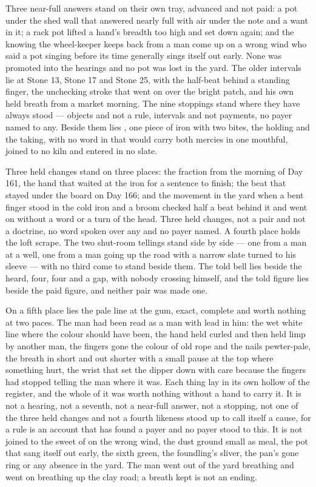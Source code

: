 Three near-full answers stand on their own tray, advanced and not paid: a pot under the shed wall that answered nearly full with air under the note and a want in it; a rack pot lifted a hand's breadth too high and set down again; and the knowing the wheel-keeper keeps back from a man come up on a wrong wind who said a pot singing before its time generally sings itself out early. None was promoted into the hearings and no pot was lost in the yard. The older intervals lie at Stone 13, Stone 17 and Stone 25, with the half-beat behind a standing finger, the unchecking stroke that went on over the bright patch, and his own held breath from a market morning. The nine stoppings stand where they have always stood --- objects and not a rule, intervals and not payments, no payer named to any. Beside them lies , one piece of iron with two bites, the holding and the taking, with no word in  that would carry both mercies in one mouthful, joined to no kiln and entered in no slate.

Three held changes stand on three places: the fraction from the morning of Day 161, the hand that waited at the iron for a sentence to finish; the beat that stayed under the board on Day 166; and the movement in the yard when a bent finger stood in the cold iron and a broom checked half a beat behind it and went on without a word or a turn of the head. Three held changes, not a pair and not a doctrine, no word spoken over any and no payer named. A fourth place holds the loft scrape. The two shut-room tellings stand side by side --- one from a man at a well, one from a man going up the road with a narrow slate turned to his sleeve --- with no third come to stand beside them. The told bell lies beside the heard, four, four and a gap, with nobody crossing himself, and the told figure lies beside the paid figure, and neither pair was made one.

On a fifth place lies the pale line at the gum, exact, complete and worth nothing at two paces. The man had been read as a man with lead in him: the wet white line where the colour should have been, the hand held curled and then held limp by another man, the fingers gone the colour of old rope and the nails pewter-pale, the breath in short and out shorter with a small pause at the top where something hurt, the wrist that set the dipper down with care because the fingers had stopped telling the man where it was. Each thing lay in its own hollow of the register, and the whole of it was worth nothing without a hand to carry it. It is not a hearing, not a seventh, not a near-full answer, not a stopping, not one of the three held changes and not a fourth likeness stood up to call itself a cause, for a rule is an account that has found a payer and no payer stood to this. It is not joined to the sweet of  on the wrong wind, the dust ground small as meal, the pot that sang itself out early, the sixth green, the foundling's sliver, the pan's gone ring or any absence in the yard. The man went out of the yard breathing and went on breathing up the clay road; a breath kept is not an ending.

